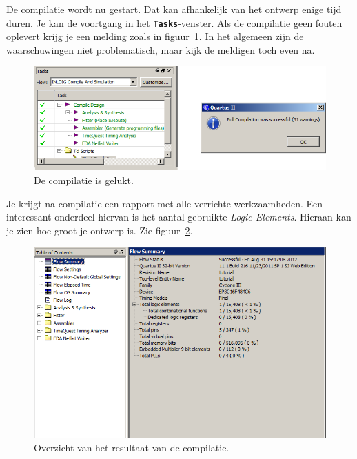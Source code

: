 \documentclass[a4paper,12pt,fleqn,twoside]{book}
\def\tutpicscale{0.455}
\newcommand{\menu}[1]{\texttt{\textbf{#1}}}
\begin{document}
De compilatie wordt nu gestart. Dat kan afhankelijk van het ontwerp enige tijd
duren. Je kan de voortgang in het \menu{Tasks}-venster. Als de compilatie geen
fouten oplevert krijg je een melding zoals in
figuur~\ref{fig:051compilecomplete}. In het algemeen zijn de waarschuwingen niet
problematisch, maar kijk de meldigen toch even na.
 
\begin{figure}[H]
\centering
\includegraphics[scale=\tutpicscale]{051compilecomplete}
\caption{De compilatie is gelukt.}
\label{fig:051compilecomplete}
\end{figure}

Je krijgt na compilatie een rapport met alle verrichte werkzaamheden. Een
interessant onderdeel hiervan is het aantal gebruikte
\textsl{Logic Elements}. Hieraan kan je zien hoe groot je ontwerp is.
Zie figuur~\ref{fig:052flowsummary}.

\begin{figure}[H]
\centering
\includegraphics[scale=\tutpicscale]{052flowsummary}
\caption{Overzicht van het resultaat van de compilatie.}
\label{fig:052flowsummary}
\end{figure}

\end{document}
